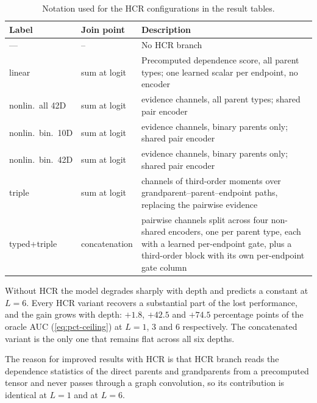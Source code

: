 \begin{table}[H]
  \centering
  \small
  \caption{Notation used for the HCR configurations in the result tables.}
  \label{tab:hcr-legend}
  \begin{tabularx}{\textwidth}{l l >{\raggedright\arraybackslash}X}
    \toprule
    Label & Join point & Description \\
    \midrule
    ---
      & {--}
      & No HCR branch \\
    \addlinespace[3pt]
    linear
      & sum at logit
      & Precomputed dependence score, all parent types; one learned scalar
        per endpoint, no encoder \\
    \addlinespace[3pt]
    nonlin.\ all 42D
      & sum at logit
      & 42 evidence channels, all parent types; shared pair encoder \\
    \addlinespace[3pt]
    nonlin.\ bin.\ 10D
      & sum at logit
      & 10 evidence channels, binary parents only; shared pair encoder \\
    \addlinespace[3pt]
    nonlin.\ bin.\ 42D
      & sum at logit
      & 42 evidence channels, binary parents only; shared pair encoder \\
    \addlinespace[3pt]
    triple
      & sum at logit
      & 13 channels of third-order moments over
        grandparent--parent--endpoint paths, replacing the pairwise
        evidence \\
    \addlinespace[3pt]
    typed+triple
      & concatenation
      & 42 pairwise channels split across four non-shared encoders, one per
        parent type, each with a learned per-endpoint gate, plus a
        third-order block with its own per-endpoint gate column \\
    \bottomrule
  \end{tabularx}
\end{table}

Without HCR the model degrades sharply with depth and predicts a constant at
$L=6$. Every HCR variant recovers a substantial part of the lost performance,
and the gain grows with depth: $+1.8$, $+42.5$ and $+74.5$ percentage points
of the oracle AUC (\cref{eq:pct-ceiling}) at $L=1$, $3$ and $6$ respectively.
The concatenated
variant is the only one that remains flat across all six depths.

The reason for improved results with HCR is that HCR branch reads the
dependence statistics of the direct parents and grandparents from a precomputed tensor and
never passes through a graph convolution, so its contribution is identical at
$L=1$ and at $L=6$. 


